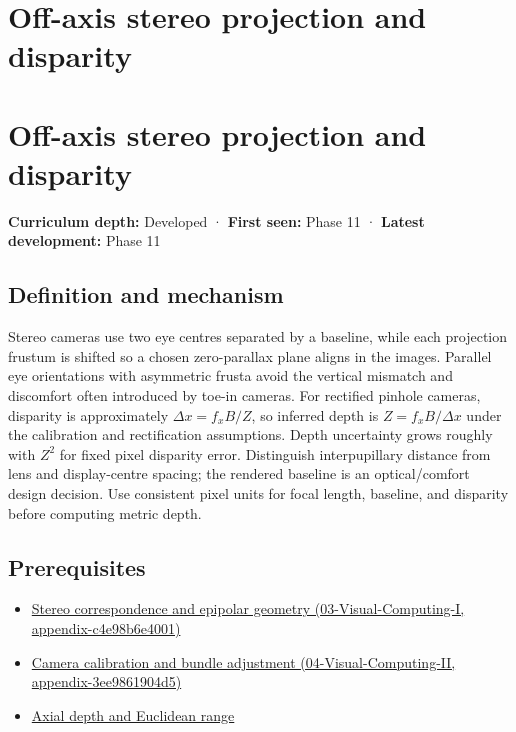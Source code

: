 \hypertarget{appendix-0976e86e5b9f}{}
\section*{Off-axis stereo projection and disparity}
\section{Off-axis stereo projection and disparity}\label{appendix-0976e86e5b9f-off-axis-stereo-projection-and-disparity}

\textbf{Curriculum depth:} Developed · \textbf{First seen:} Phase 11 · \textbf{Latest development:} Phase 11

\subsection{Definition and mechanism}\label{appendix-0976e86e5b9f-definition-and-mechanism}

Stereo cameras use two eye centres separated by a baseline, while each projection frustum is shifted so a chosen zero-parallax plane aligns in the images. Parallel eye orientations with asymmetric frusta avoid the vertical mismatch and discomfort often introduced by toe-in cameras. For rectified pinhole cameras, disparity is approximately \(\Delta x=f_xB/Z\), so inferred depth is \(Z=f_xB/\Delta x\) under the calibration and rectification assumptions. Depth uncertainty grows roughly with \(Z^2\) for fixed pixel disparity error. Distinguish interpupillary distance from lens and display-centre spacing; the rendered baseline is an optical/comfort design decision. Use consistent pixel units for focal length, baseline, and disparity before computing metric depth.

\subsection{Prerequisites}\label{appendix-0976e86e5b9f-prerequisites}

\begin{itemize}
\tightlist
\item
  \href{../03-Visual-Computing-I/main.pdf\#nameddest=appendix-c4e98b6e4001}{Stereo correspondence and epipolar geometry (03-Visual-Computing-I, appendix-c4e98b6e4001)}
\item
  \href{../04-Visual-Computing-II/main.pdf\#nameddest=appendix-3ee9861904d5}{Camera calibration and bundle adjustment (04-Visual-Computing-II, appendix-3ee9861904d5)}
\item
  \hyperref[appendix-cac01ebeeb11]{Axial depth and Euclidean range}
\end{itemize}

